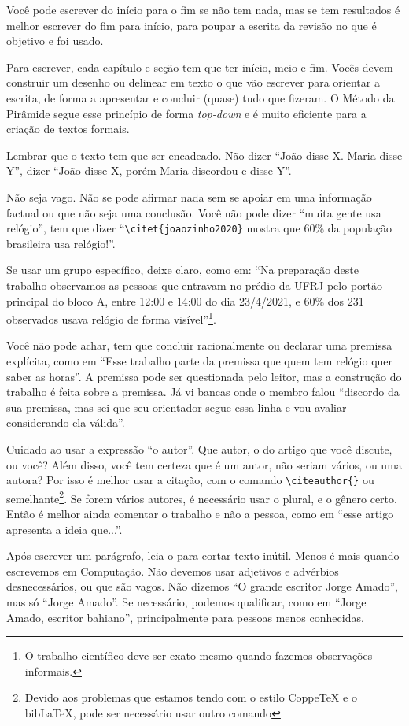 \documentclass{article}
\begin{document}
Você pode escrever do início para o fim se não tem nada, mas se tem resultados é melhor escrever do fim para início, para poupar a escrita da revisão no que é objetivo e foi usado.

Para escrever, cada capítulo e seção tem que ter início, meio e fim. Vocês devem construir um desenho ou delinear em texto o que vão escrever para orientar a escrita, de forma a apresentar e concluir (quase) tudo que fizeram. 
O Método da Pirâmide\citep{minto1,minto2} segue esse princípio de forma \textit{top-down} e é muito eficiente para a criação de textos formais.

Lembrar que o texto tem que ser encadeado. Não dizer ``João disse X. Maria disse Y'', dizer ``João disse X, porém Maria discordou e disse Y''.

Não seja vago. Não se pode afirmar nada sem se apoiar em uma informação factual ou que não seja uma conclusão. Você não pode dizer ``muita gente usa relógio'', tem que dizer ``\verb!\citet{joaozinho2020}! mostra que 60\% da população brasileira usa relógio!''.

Se usar um grupo específico, deixe claro, como em: ``Na preparação deste trabalho observamos as pessoas que entravam no prédio da UFRJ pelo portão principal do bloco A, entre 12:00 e 14:00 do dia 23/4/2021, e 60\% dos 231 observados usava relógio de forma visível''\footnote{O trabalho científico deve ser exato mesmo quando fazemos observações informais.}.

Você não pode achar, tem que concluir racionalmente ou declarar uma premissa explícita, como em ``Esse trabalho parte da premissa que quem tem relógio quer saber as horas''. A premissa pode ser questionada pelo leitor, mas a construção do trabalho é feita sobre a premissa. Já vi bancas onde o membro falou ``discordo da sua premissa, mas sei que seu orientador segue essa linha e vou avaliar considerando ela válida''.

Cuidado ao usar a expressão ``o autor''. Que autor, o do artigo que você discute, ou você? Além disso, você tem certeza que é um autor, não seriam vários, ou uma autora? Por isso é melhor usar a citação, com o comando \verb!\citeauthor{}! ou semelhante\footnote{Devido aos problemas que estamos tendo com o estilo CoppeTeX e o bib\LaTeX, pode ser necessário usar outro comando}. Se forem vários autores, é necessário usar o plural, e o gênero certo. Então é melhor ainda comentar o trabalho e não a pessoa, como em ``esse artigo apresenta a ideia que...''.

Após escrever um parágrafo, leia-o para cortar texto inútil. Menos é mais quando escrevemos em Computação. Não devemos usar adjetivos e advérbios desnecessários, ou que são vagos. Não dizemos ``O grande escritor Jorge Amado'', mas só ``Jorge Amado''. Se necessário, podemos qualificar, como em ``Jorge Amado, escritor bahiano'', principalmente para pessoas menos conhecidas.
\end{document}
